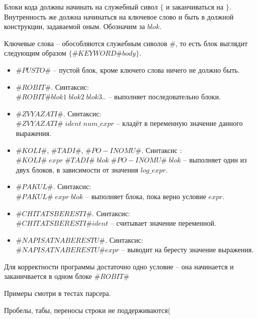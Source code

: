 \documentclass[12pt]{article}
\begin{document}
Блоки кода должны начинать на служебный сивол $\{$ и заканчиваться на $\}$. Внутренность же должна начинаться на ключевое слово и быть в должной конструкции, задаваемой оным. Обозначим за $blok$.

Ключевые слова -- обособляются служебным сиволов $\#$, то есть блок выглядит следующим образом $\{\#KEYWORD\#body\}$.
\begin{itemize}
\item $\#PUSTO\#$ -- пустой блок, кроме ключего слова ничего не должно быть.
\item $\#ROBIT\#$. Синтаксис:\\
$\#ROBIT\#blok1\;blok2\;blok3..$ -- выполняет последовательно блоки.
\item $\#ZVYAZATI\#$. Синтаксис:\\
$\#ZVYAZATI\#\;ident\;num\_expr$ -- кладёт в переменную значение данного выражения.
\item $\#KOLI\#$, $\#TADI\#$, $\#PO-INOMU\#$. Синтаксис :\\
 $\#KOLI\#\;expr\;\#TADI\#\;blok\;\#PO-INOMU\#\; blok$ -- выполняет один из двух блоков, в зависимости от значения $log\_expr$.
\item $\#PAKUL\#$. Синтаксис:\\
$\#PAKUL\#\;expr\;blok$ -- выполняет блока, пока верно условие $expr$.
\item $\#CHITATSBERESTI\#$. Синтаксис:\\
$\#CHITATSBERESTI\# ident$ -- считывает значение переменной.
\item $\#NAPISATNABERESTU\#$. Синтаксис:\\
$\#NAPISATNABERESTU\# expr$ -- выводит на бересту значение выражения.
\end{itemize}

Для корректности программы достаточно одно условие -- она начинается и заканичвается в одном блоке $\#ROBIT\#$

Примеры смотри в тестах парсера.

Пробелы, табы, переносы строки не поддерживаются(
\end{document}

